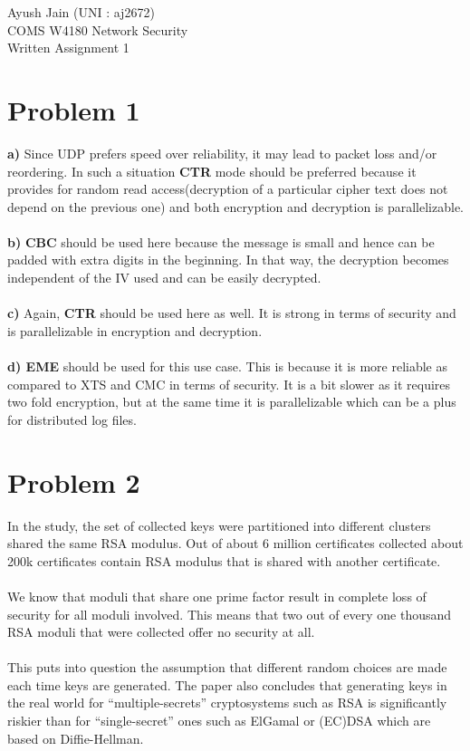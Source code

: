 \documentclass[10pt]{article}
\begin{document}
\vspace*{\fill}
\begin{Huge}
\begin{center}
Ayush Jain (UNI : aj2672)\\
COMS W4180 Network Security\\
Written Assignment 1\\
\end{center}
\end{Huge}
\vspace*{\fill}
\newpage
\section{Problem 1}
\textbf{a)} Since UDP prefers speed over reliability, it may lead to packet loss and/or reordering. In such a situation \textbf{CTR} mode should be preferred because it provides for random read access(decryption of a particular cipher text does not depend on the previous one) and both encryption and decryption is parallelizable.\\\\
\textbf{b)} \textbf{CBC} should be used here because the message is small and hence can be padded with extra digits in the beginning. In that way, the decryption becomes independent of the IV used and can be easily decrypted.\\\\
\textbf{c)} Again, \textbf{CTR} should be used here as well. It is strong in terms of security and is parallelizable in encryption and decryption.\\\\
\textbf{d) EME} should be used for this use case. This is because it is more reliable as compared to XTS and CMC in terms of security. It is a bit slower as it requires two fold encryption, but at the same time it is parallelizable which can be a plus for distributed log files.
\section{Problem 2}
In the study, the set of collected keys were partitioned into different clusters shared the same RSA modulus. Out of about 6 million certificates collected about 200k certificates contain RSA modulus that is shared with another certificate.\\\\
We know that moduli that share one prime factor result in complete loss of security for all moduli involved. This means that two out of every one thousand RSA moduli that were collected offer no security at all. \\\\
This puts into question the assumption that different random choices are made each time keys are generated. The paper also concludes that generating keys in the real world for “multiple-secrets” cryptosystems such as RSA is significantly riskier than for “single-secret” ones such as ElGamal or (EC)DSA which are based on Diffie-Hellman.
\end{document}
